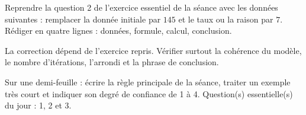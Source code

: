 
\begin{homework}Reprendre la question 2 de l'exercice essentiel de la séance avec les données suivantes : remplacer la donnée initiale par $145$ et le taux ou la raison par $7$. Rédiger en quatre lignes : données, formule, calcul, conclusion.\end{homework}
\begin{solution}La correction dépend de l'exercice repris. Vérifier surtout la cohérence du modèle, le nombre d'itérations, l'arrondi et la phrase de conclusion.\end{solution}

\begin{exitticket}[3 minutes]Sur une demi-feuille : écrire la règle principale de la séance, traiter un exemple très court et indiquer son degré de confiance de 1 à 4. Question(s) essentielle(s) du jour : 1, 2 et 3.\end{exitticket}

